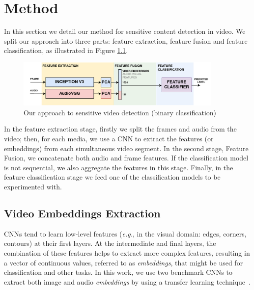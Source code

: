 \newpage

\chapter{Method}
\label{chap:method}
In this section we detail our method for sensitive content detection in video. We split our approach into three parts: feature extraction, feature fusion and feature classification, as illustrated in Figure \ref{fig:model}.
\begin{figure}[!ht]
    \centering
    \includegraphics[width=0.9\textwidth]{img/model-2.png}
    \caption{Our approach to sensitive video detection (binary classification)}
    \label{fig:model}
\end{figure}

In the feature extraction stage, firstly we split the frames and audio from the video; then, for each media, we use a CNN to extract the features (or embeddings) from each simultaneous video segment. In the second stage, Feature Fusion, we concatenate both audio and frame features. If the classification model is not sequential, we also aggregate the features in this stage. Finally, in the feature classification stage we feed one of the classification models to be experimented with.

\section{Video Embeddings Extraction}
\label{sec:video_features}

CNNs tend to learn low-level features (\textit{e.g.}, in the visual domain: edges, corners, contours) at their first layers. At the intermediate and final layers, the combination of these features helps to extract more complex features, resulting in a vector of continuous values, referred to as \textit{embeddings}, that might be used for classification and other tasks. In this work, we use two benchmark CNNs to extract both image and audio \textit{embeddings} by using a transfer learning technique~\cite{tan2018survey}.




